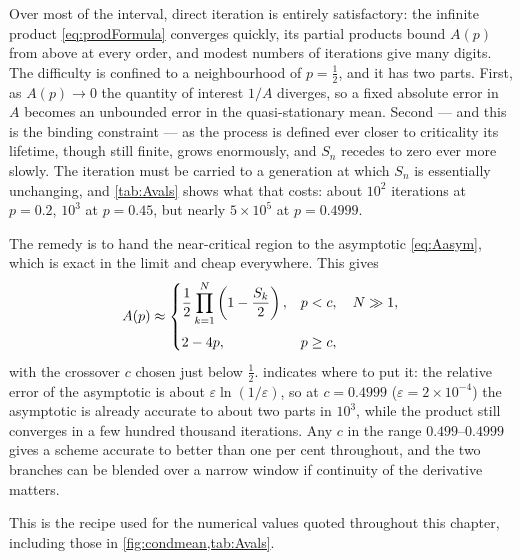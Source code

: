 Over most of the interval, direct iteration is entirely satisfactory: the infinite
product \cref{eq:prodFormula} converges quickly, its partial products bound $A(p)$
from above at every order, and modest numbers of iterations give many digits. The
difficulty is confined to a neighbourhood of $p=\tfrac12$, and it has two parts.
First, as $A(p)\to0$ the quantity of interest $1/A$ diverges, so a fixed absolute
error in $A$ becomes an unbounded error in the quasi-stationary mean. Second --- and
this is the binding constraint --- as the process is defined ever closer to
criticality its lifetime, though still finite, grows enormously, and $S_n$ recedes to
zero ever more slowly. The iteration must be carried to a generation at which $S_n$ is
essentially unchanging, and \cref{tab:Avals} shows what that costs: about $10^2$
iterations at $p=0.2$, $10^3$ at $p=0.45$, but nearly $5\times10^5$ at $p=0.4999$.

The remedy is to hand the near-critical region to the asymptotic \cref{eq:Aasym},
which is exact in the limit and cheap everywhere. This gives
\begin{equation}
\label{eq:Apractical}
A(p) \approx
\begin{cases}
\displaystyle \frac12\prod_{k=1}^{N}\left(1-\frac{S_k}{2}\right), & p<c,\quad N\gg1,\\[14pt]
2-4p, & p\ge c,
\end{cases}
\end{equation}
with the crossover $c$ chosen just below $\tfrac12$.  indicates where
to put it: the relative error of the asymptotic is about
$\varepsilon\ln(1/\varepsilon)$, so at $c = 0.4999$ ($\varepsilon = 2\times10^{-4}$)
the asymptotic is already accurate to about two parts in $10^3$, while the product
still converges in a few hundred thousand iterations. Any $c$ in the range
$0.499$--$0.4999$ gives a scheme accurate to better than one per cent throughout, and
the two branches can be blended over a narrow window if continuity of the derivative
matters.

This is the recipe used for the numerical values quoted throughout this chapter,
including those in \cref{fig:condmean,tab:Avals}.

\FloatBarrier
